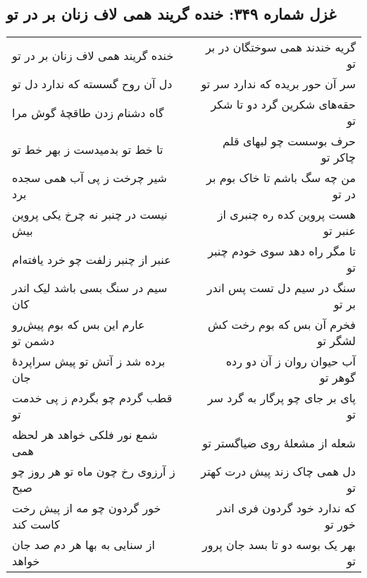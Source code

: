 \begin{center}
\section*{غزل شماره ۳۴۹: خنده گریند همی لاف زنان بر در تو}
\label{sec:349}
\begin{longtable}{l p{0.5cm} r}
خنده گریند همی لاف زنان بر در تو
&&
گریه خندند همی سوختگان در بر تو
\\
دل آن روح گسسته که ندارد دل تو
&&
سر آن حور بریده که ندارد سر تو
\\
گاه دشنام زدن طاقچهٔ گوش مرا
&&
حقه‌های شکرین گرد دو تا شکر تو
\\
تا خط تو بدمیدست ز بهر خط تو
&&
حرف بوسست چو لبهای قلم چاکر تو
\\
شیر چرخت ز پی آب همی سجده برد
&&
من چه سگ باشم تا خاک بوم بر در تو
\\
نیست در چنبر نه چرخ یکی پروین بیش
&&
هست پروین کده ره چنبری از عنبر تو
\\
عنبر از چنبر زلفت چو خرد یافته‌ام
&&
تا مگر راه دهد سوی خودم چنبر تو
\\
سیم در سنگ بسی باشد لیک اندر کان
&&
سنگ در سیم دل تست پس اندر بر تو
\\
عارم این بس که بوم پیش‌رو دشمن تو
&&
فخرم آن بس که بوم رخت کش لشگر تو
\\
برده شد ز آتش تو پیش سراپردهٔ جان
&&
آب حیوان روان ز آن دو رده گوهر تو
\\
قطب گردم چو بگردم ز پی خدمت تو
&&
پای بر جای چو پرگار به گرد سر تو
\\
شمع نور فلکی خواهد هر لحظه همی
&&
شعله از مشعلهٔ روی ضیاگستر تو
\\
ز آرزوی رخ چون ماه تو هر روز چو صبح
&&
دل همی چاک زند پیش درت کهتر تو
\\
خور گردون چو مه از پیش رخت کاست کند
&&
که ندارد خود گردون فری اندر خور تو
\\
از سنایی به بها هر دم صد جان خواهد
&&
بهر یک بوسه دو تا بسد جان پرور تو
\\
\end{longtable}
\end{center}
